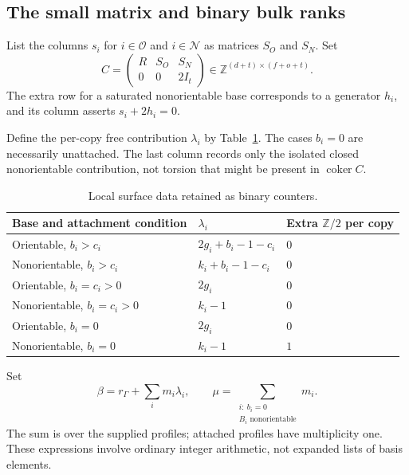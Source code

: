 \documentclass[11pt]{article}
\theoremstyle{definition}
\theoremstyle{remark}
\newcommand{\Z}{\mathbb Z}
\newcommand{\coker}{\operatorname{coker}}
\newcommand{\satO}{\mathcal O}
\newcommand{\satN}{\mathcal N}
\begin{document}
\subsection{The small matrix and binary bulk ranks}
List the columns $s_i$ for $i\in\satO$ and $i\in\satN$ as matrices $S_O$
and $S_N$. Set
\begin{equation}
 C=\begin{pmatrix}
 R&S_O&S_N\\
 0&0&2I_t
 \end{pmatrix}\in\Z^{(d+t)\times(f+o+t)}.
 \label{eq:matrix}
\end{equation}
The extra row for a saturated nonorientable base corresponds to a generator
$h_i$, and its column asserts $s_i+2h_i=0$.

Define the per-copy free contribution $\lambda_i$ by Table~\ref{tab:local}.
The cases $b_i=0$ are necessarily unattached. The last column records only
the isolated closed nonorientable contribution, not torsion that might be
present in $\coker C$.

\begin{table}[ht]
\centering
\begin{tabular}{@{}lll@{}}
\toprule
Base and attachment condition & $\lambda_i$ & Extra $\Z/2$ per copy\\
\midrule
Orientable, $b_i>c_i$ & $2g_i+b_i-1-c_i$ & $0$\\
Nonorientable, $b_i>c_i$ & $k_i+b_i-1-c_i$ & $0$\\
Orientable, $b_i=c_i>0$ & $2g_i$ & $0$\\
Nonorientable, $b_i=c_i>0$ & $k_i-1$ & $0$\\
Orientable, $b_i=0$ & $2g_i$ & $0$\\
Nonorientable, $b_i=0$ & $k_i-1$ & $1$\\
\bottomrule
\end{tabular}
\caption{Local surface data retained as binary counters.}
\label{tab:local}
\end{table}

Set
\begin{equation}
 \beta=r_\Gamma+\sum_i m_i\lambda_i,
 \qquad
 \mu=\sum_{\substack{i:\ b_i=0\\ B_i\text{ nonorientable}}}m_i.
 \label{eq:bulk}
\end{equation}
The sum is over the supplied profiles; attached profiles have multiplicity
one. These expressions involve ordinary integer arithmetic, not expanded
lists of basis elements.
\end{document}

